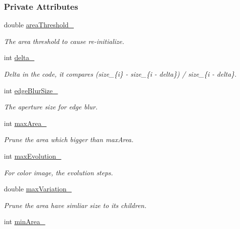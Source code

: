 \subsubsection*{Private Attributes}
\begin{DoxyCompactItemize}
\item 
double \hyperlink{group___feature_extractor_ade4ed6ec57dbfefd1a263fa29419e54d}{area\-Threshold\-\_\-}
\begin{DoxyCompactList}\small\item\em The area threshold to cause re-\/initialize. \end{DoxyCompactList}\item 
int \hyperlink{group___feature_extractor_a55dae2de52e614532d2243ca113fb3fb}{delta\-\_\-}
\begin{DoxyCompactList}\small\item\em Delta in the code, it compares (size\-\_\-\{i\} -\/ size\-\_\-\{i -\/ delta\}) / size\-\_\-\{i -\/ delta\}. \end{DoxyCompactList}\item 
int \hyperlink{group___feature_extractor_a1850b5af2915831475ef9d776e8a72ea}{edge\-Blur\-Size\-\_\-}
\begin{DoxyCompactList}\small\item\em The aperture size for edge blur. \end{DoxyCompactList}\item 
int \hyperlink{group___feature_extractor_a74d77b8596474323f1c4581ddf1d7fa2}{max\-Area\-\_\-}
\begin{DoxyCompactList}\small\item\em Prune the area which bigger than max\-Area. \end{DoxyCompactList}\item 
int \hyperlink{group___feature_extractor_a135d54a9a46522e800ef26ecfb8f18be}{max\-Evolution\-\_\-}
\begin{DoxyCompactList}\small\item\em For color image, the evolution steps. \end{DoxyCompactList}\item 
double \hyperlink{group___feature_extractor_a9353f0657019b0177c8ce65c00d826f4}{max\-Variation\-\_\-}
\begin{DoxyCompactList}\small\item\em Prune the area have simliar size to its children. \end{DoxyCompactList}\item 
int \hyperlink{group___feature_extractor_a556156bf90c6cff20f7451134dc5c9f3}{min\-Area\-\_\-}

\end{DoxyCompactItemize}

